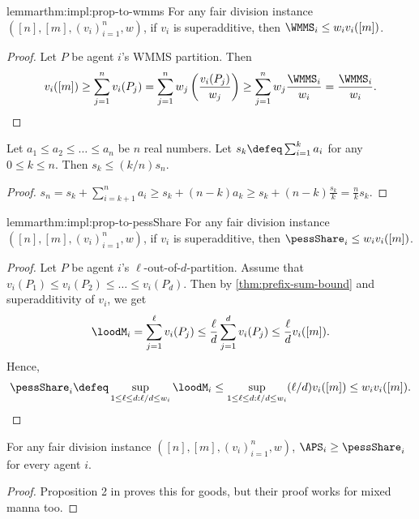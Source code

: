 \begin{restatable}{lemma}{rthm:impl:prop-to-wmms}
\label{thm:impl:prop-to-wmms}
For any fair division instance $([n], [m], (v_i)_{i=1}^n, w)$,
if $v_i$ is superadditive, then $\WMMS_i \le w_iv_i([m])$.
\end{restatable}
\begin{proof}
Let $P$ be agent $i$'s WMMS partition. Then
\[ v_i([m]) \ge \sum_{j=1}^n v_i(P_j) = \sum_{j=1}^n w_j\left(\frac{v_i(P_j)}{w_j}\right)
    \ge \sum_{j=1}^n w_j\frac{\WMMS_i}{w_i} = \frac{\WMMS_i}{w_i}. \qedhere \]
\end{proof}

\begin{lemma}
\label{thm:prefix-sum-bound}
Let $a_1 \le a_2 \le \ldots \le a_n$ be $n$ real numbers.
Let $s_k \defeq \sum_{i=1}^k a_i$ for any $0 \le k \le n$.
Then $s_k \le (k/n)s_n$.
\end{lemma}
\begin{proof}
$\displaystyle s_n = s_k + \sum_{i=k+1}^n a_i \ge s_k + (n-k)a_k \ge s_k + (n-k)\frac{s_k}{k}
= \frac{n}{k}s_k$.
\end{proof}

\begin{restatable}{lemma}{rthm:impl:prop-to-pessShare}
\label{thm:impl:prop-to-pessShare}
For any fair division instance $([n], [m], (v_i)_{i=1}^n, w)$,
if $v_i$ is superadditive, then $\pessShare_i \le w_iv_i([m])$.
\end{restatable}
\begin{proof}
Let $P$ be agent $i$'s $\ell$-out-of-$d$-partition.
Assume \wLoG{} that $v_i(P_1) \le v_i(P_2) \le \ldots \le v_i(P_d)$.
Then by \cref{thm:prefix-sum-bound} and superadditivity of $v_i$, we get
\[ \loodM_i = \sum_{j=1}^{\ell} v_i(P_j)
    \le \frac{\ell}{d}\sum_{j=1}^d v_i(P_j) \le \frac{\ell}{d}v_i([m]). \]
Hence,
\[ \pessShare_i \defeq \sup_{1 \le \ell \le d: \ell/d \le w_i} \loodM_i
    \le \sup_{1 \le \ell \le d: \ell/d \le w_i} (\ell/d)v_i([m]) \le w_iv_i([m]).
    \qedhere \]
\end{proof}

\begin{lemma}
\label{thm:impl:aps-to-pess}
For any fair division instance $([n], [m], (v_i)_{i=1}^n, w)$,
$\APS_i \ge \pessShare_i$ for every agent $i$.
\end{lemma}
\begin{proof}
Proposition 2 in \cite{babaioff2023fair} proves this for goods,
but their proof works for mixed manna too.
\end{proof}

